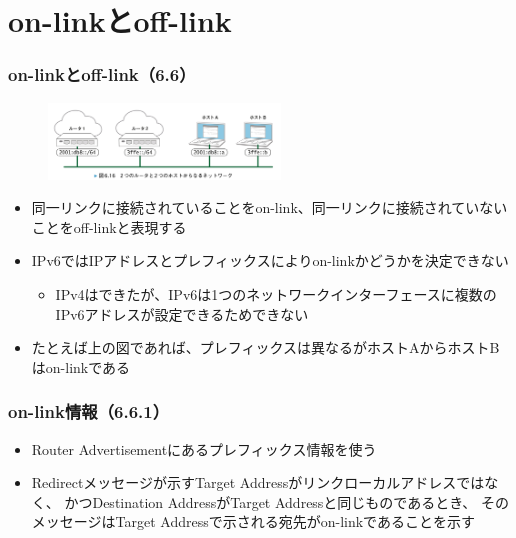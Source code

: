 \section{on-linkとoff-link}

\begin{frame}
  \frametitle{on-linkとoff-link（6.6）}

  \begin{center}
    \begin{figure}
      \includegraphics[width=0.55\textwidth]{img/figure6_16.png}
    \end{figure}
  \end{center}

  \begin{itemize}
    \item 同一リンクに接続されていることをon-link、同一リンクに接続されていないことをoff-linkと表現する

    \item IPv6ではIPアドレスとプレフィックスによりon-linkかどうかを決定できない
    \begin{itemize}
      \item IPv4はできたが、IPv6は1つのネットワークインターフェースに複数のIPv6アドレスが設定できるためできない
    \end{itemize}

    \item たとえば上の図であれば、プレフィックスは異なるがホストAからホストBはon-linkである
  \end{itemize}
\end{frame}

\begin{frame}
  \frametitle{on-link情報（6.6.1）}

  \begin{itemize}
    \item Router Advertisementにあるプレフィックス情報を使う

    \item Redirectメッセージが示すTarget Addressがリンクローカルアドレスではなく、
    かつDestination AddressがTarget Addressと同じものであるとき、
    そのメッセージはTarget Addressで示される宛先がon-linkであることを示す
  \end{itemize}
\end{frame}

